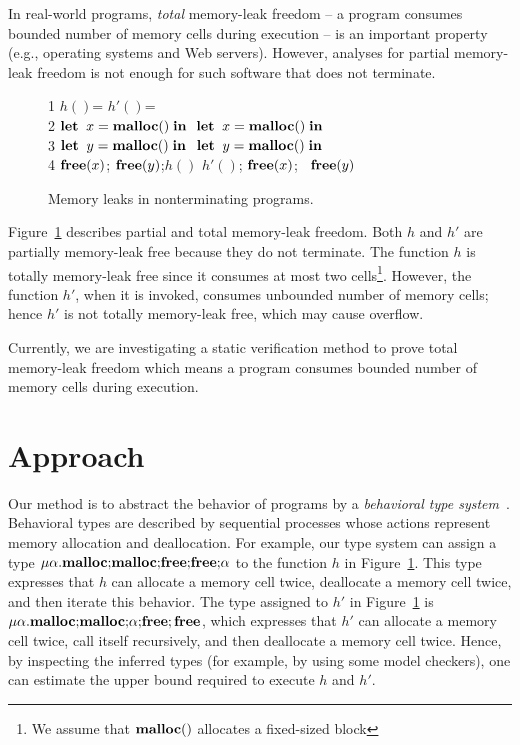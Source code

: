 \documentclass{sigplanconf}
\begin{document}
In real-world programs, \emph{total} memory-leak freedom -- a program
consumes bounded number of memory cells during execution -- is an
important property (e.g., operating systems and Web servers). However,
analyses for partial memory-leak freedom is not enough for such
software that does not terminate.

\begin{exmp}\label{ex:ex1}
\begin{figure}[h]
1  \;\;$h()$= \dtb \dtb  \dtb      \dtb          \dtb $h'()$= \\
2  \dtb $\mathbf{let}\; \; x = \mathbf{malloc()}  \; \mathbf{in}\;$ \dtb \;\;\;\;$\mathbf{let}\; \; x = \mathbf{malloc()}  \; \mathbf{in}\;$\\
3  \dtb $\mathbf{let}\; \; y = \mathbf{malloc()}  \; \mathbf{in}\;$ \dtb \;\;\;\; $\mathbf{let}\; \; y = \mathbf{malloc()}  \; \mathbf{in}\;$\\
4  \dtb $\mathbf{free}(x)$; $\mathbf{free}(y) $;\;$h()$ \dtb \;\;\;\;\;\;$h'()$; $\mathbf{free}(x)$; \ $\mathbf{free}(y)$
\caption{Memory leaks in nonterminating programs.}
\label{ex:np}
\end{figure}
Figure~\ref{ex:np} describes partial and total memory-leak freedom.
Both \(h\) and \(h'\) are partially memory-leak free because they do
not terminate. The function \(h\) is totally memory-leak free since it
consumes at most two cells\footnote{We assume that \(\mathbf{malloc()}\)
  allocates a fixed-sized block}.  However, the function \(h'\), when
it is invoked, consumes unbounded number of memory cells; hence \(h'\)
is not totally memory-leak free, which may cause overflow.
\end{exmp}

Currently, we are investigating a static verification method to prove
total memory-leak freedom which means a program consumes bounded
number of memory cells during execution.

\section{Approach}
Our method is to abstract the behavior of programs by a
\emph{behavioral type
  system}~\cite{DBLP:journals/lmcs/KobayashiSW06,DBLP:journals/tcs/IgarashiK04,DBLP:conf/esop/HondaVK98}.
Behavioral types are described by sequential processes whose actions
represent memory allocation and deallocation. For example, our type
system can assign a type
\(\mu\alpha.\mathbf{malloc};\!\mathbf{malloc};\!\mathbf{free};\!\mathbf{free};\!\alpha\) to
the function \(h\) in Figure~\ref{ex:np}.  This type expresses that
\(h\) can allocate a memory cell twice, deallocate a memory cell
twice, and then iterate this behavior.  The type assigned to \(h'\) in
Figure~\ref{ex:np} is
\(\mu\alpha.\mathbf{malloc};\!\mathbf{malloc};\!\alpha;\!\mathbf{free};\mathbf{free}\), which
expresses that \(h'\) can allocate a memory cell twice, call itself
recursively, and then deallocate a memory cell twice.  Hence, by
inspecting the inferred types (for example, by using some model
checkers), one can estimate the upper bound required to execute \(h\)
and \(h'\).
\end{document}
